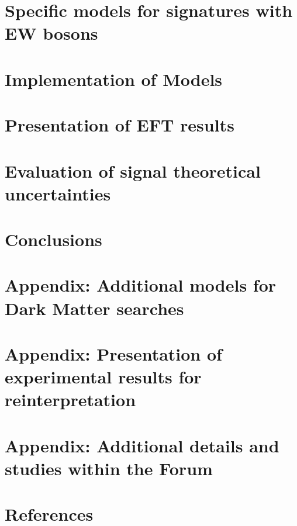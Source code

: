 \documentclass[review]{elsarticle}
\begin{document}
\section{Specific models for signatures with EW bosons}
\label{subsec:EWSpecificModels}


\section{Implementation of Models}
\label{app:MonojetLikeModels_Appendix}


\section{Presentation of EFT results}
\label{sec:EFTValidity} 


\section{Evaluation of signal theoretical uncertainties}
\label{sec:TheoryUncertainties} 


\section{Conclusions}
\label{section:conclusions}




\appendix

\section{Appendix: Additional models for Dark Matter searches}
\label{app:EWSpecificModels_Appendix}


\section{Appendix: Presentation of experimental results for reinterpretation}
\label{app:Presentation_Of_Experimental_Results}


\section{Appendix: Additional details and studies within the Forum}
\label{app:Additional_details}


\section*{References}


\end{document}
